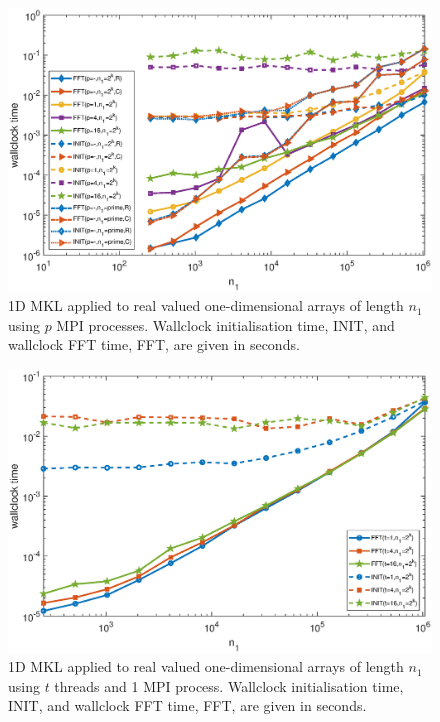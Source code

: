 \documentclass[a4]{article}
\begin{document}
\begin{figure}[!htbp]
\begin{center}
 \includegraphics[width=.9\textwidth, height=0.42\textheight]{MKL1D_times_fig.eps}
\caption{1D MKL applied to real valued one-dimensional arrays of length $n_1$ using $p$ MPI processes. Wallclock initialisation time, INIT, and wallclock FFT time, FFT, are given in seconds.}
\label{Fig:mkl1d_times}
\end{center}
\end{figure}




\begin{figure}[!htbp]
\begin{center}
 \includegraphics[width=.9\textwidth, height=0.42\textheight]{MKL1D_threads_times_fig.eps}
\caption{1D MKL applied to real valued one-dimensional arrays of length $n_1$ using $t$ threads and 1 MPI process. Wallclock initialisation time, INIT, and wallclock FFT time, FFT, are given in seconds.}
\label{Fig:mkl1d_threads_times}
\end{center}
\end{figure}
\end{document}
